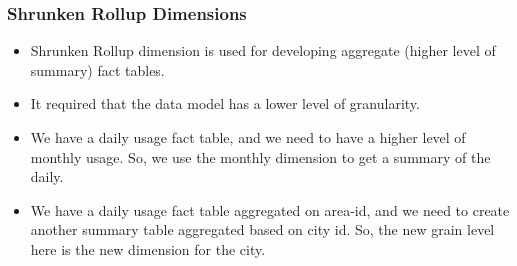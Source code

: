 \VideoClassification[column=1, colour=blue]
\begin{frame}
    \frametitle{Shrunken Rollup Dimensions}%
    \begin{itemize}[<+->]    	
		\item Shrunken Rollup dimension is used for developing aggregate (higher level of summary) fact tables. 
		\item It required that the data model has a lower level of granularity.
	\end{itemize}
		\begin{example}
		    \begin{itemize}[<+->]    	
			\item We have a daily usage fact table, and we need to have a higher level of monthly usage. So, we use the monthly dimension to get a summary of the daily.
			\item We have a daily usage fact table aggregated on area-id, and we need to create another summary table aggregated based on city id. So, the new grain level here is the new dimension for the city.
			\end{itemize}
		\end{example}
\end{frame}
